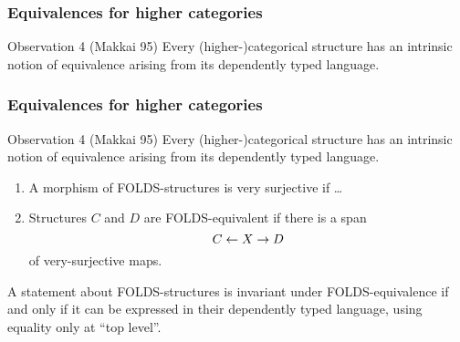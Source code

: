 \documentclass{beamer}
\begin{document}
\begin{frame}[t]
  \frametitle{Equivalences for higher categories}
  \begin{block}{Observation 4 (Makkai 95)}
    Every (higher-)categorical structure has an intrinsic notion of \alert<1>{equivalence} arising from its dependently typed language.
  \end{block}
  \begin{enumerate}
  \end{enumerate}
\end{frame}

\begin{frame}[t]
  \frametitle{Equivalences for higher categories}
  \begin{block}{Observation 4 (Makkai 95)}
    Every (higher-)categorical structure has an intrinsic notion of {equivalence} arising from its dependently typed language.
  \end{block}
  \begin{enumerate}
  \item A morphism of FOLDS-structures is \alert<1>{very surjective} if \dots
  \item Structures $C$ and $D$ are \alert<1>{FOLDS-equivalent} if there is a span
    \[ C \leftarrow X \to D\]
    of very-surjective maps.
  \end{enumerate}
  \pause
  \begin{theorem}[Makkai 95]
    A {statement} about FOLDS-structures is invariant under FOLDS-equivalence \alert<2>{if and only if} it can be expressed in their dependently typed language, using equality only at ``top level''.
  \end{theorem}
\end{frame}
\end{document}
